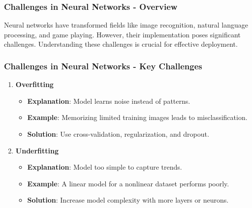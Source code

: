 \documentclass[aspectratio=169]{beamer}
\begin{document}
\begin{frame}[fragile]
    \frametitle{Challenges in Neural Networks - Overview}
    Neural networks have transformed fields like image recognition, natural language processing, and game playing. However, their implementation poses significant challenges. 
    Understanding these challenges is crucial for effective deployment.
\end{frame}

\begin{frame}[fragile]
    \frametitle{Challenges in Neural Networks - Key Challenges}
    \begin{enumerate}
        \item \textbf{Overfitting}
            \begin{itemize}
                \item \textbf{Explanation}: Model learns noise instead of patterns.
                \item \textbf{Example}: Memorizing limited training images leads to misclassification.
                \item \textbf{Solution}: Use cross-validation, regularization, and dropout.
            \end{itemize}
            
        \item \textbf{Underfitting}
            \begin{itemize}
                \item \textbf{Explanation}: Model too simple to capture trends.
                \item \textbf{Example}: A linear model for a nonlinear dataset performs poorly.
                \item \textbf{Solution}: Increase model complexity with more layers or neurons.
            \end{itemize}
    \end{enumerate}
\end{frame}
\end{document}
